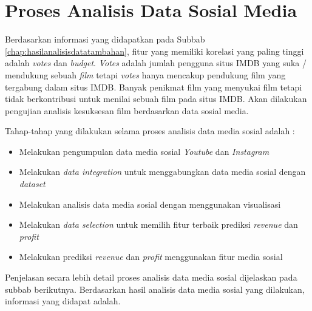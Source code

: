 \section{Proses Analisis Data Sosial Media} 
Berdasarkan informasi yang didapatkan pada Subbab \ref{chap:hasilanalisisdatatambahan}, fitur yang memiliki korelasi yang paling tinggi adalah \textit{votes} dan \textit{budget}. \textit{Votes} adalah jumlah pengguna situs IMDB yang suka / mendukung sebuah \textit{film} tetapi \textit{votes} hanya mencakup pendukung film yang tergabung dalam situs IMDB. Banyak penikmat film yang menyukai film tetapi tidak berkontribusi untuk menilai sebuah film pada situs IMDB. Akan dilakukan pengujian analisis kesuksesan film berdasarkan data sosial media.

Tahap-tahap yang dilakukan selama proses analisis data media sosial adalah : 

\begin{itemize}
\item Melakukan pengumpulan data media sosial \textit{Youtube} dan \textit{Instagram}

\item Melakukan \textit{data integration} untuk menggabungkan data media sosial dengan \textit{dataset}

\item Melakukan analisis data media sosial dengan menggunakan visualisasi 

\item Melakukan \textit{data selection} untuk memilih fitur terbaik prediksi \textit{revenue} dan \textit{profit} 

\item Melakukan prediksi \textit{revenue} dan \textit{profit} menggunakan fitur media sosial 
\end{itemize} 



Penjelasan secara lebih detail proses analisis data media sosial dijelaskan pada subbab berikutnya. Berdasarkan hasil analisis data media sosial yang dilakukan, informasi yang didapat adalah. 

